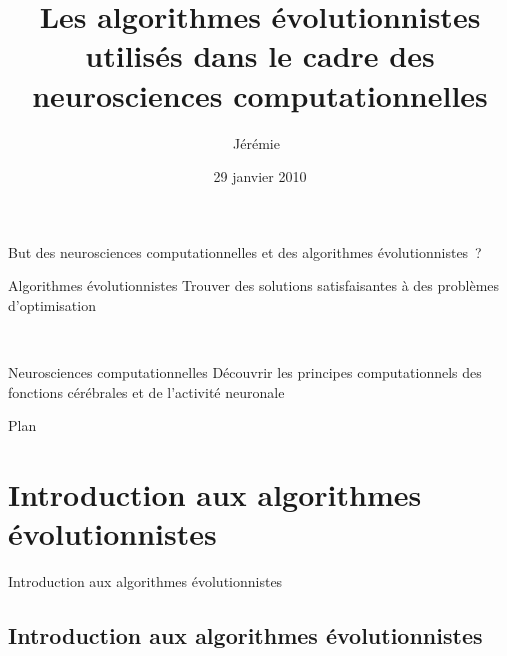 \documentclass{beamer}
\title{Les algorithmes évolutionnistes utilisés dans le cadre des
       neurosciences computationnelles}
\author[Decock]{Jérémie~\bsc{Decock}}
\institute{UPMC}
\date{29 janvier 2010}
\begin{document}

\begin{frame}
    \titlepage
\end{frame}


\begin{frame}{But des neurosciences computationnelles et des algorithmes
              évolutionnistes~?}
    \begin{block}{Algorithmes évolutionnistes}
        Trouver des solutions satisfaisantes à des problèmes d'optimisation
    \end{block}
    ~\\
    \begin{block}{Neurosciences computationnelles}
        Découvrir les principes computationnels des fonctions cérébrales et de
        l'activité neuronale
    \end{block}
\end{frame}


\begin{frame}{Plan}
    \tableofcontents[sectionstyle=show/show,subsectionstyle=hide/hide/hide]
\end{frame}


\section{Introduction aux algorithmes évolutionnistes}

\begin{frame}
    \begin{center}
        {\LARGE Introduction aux algorithmes évolutionnistes}
    \end{center}
\end{frame}

\subsection{Introduction aux algorithmes évolutionnistes}
\end{document}
